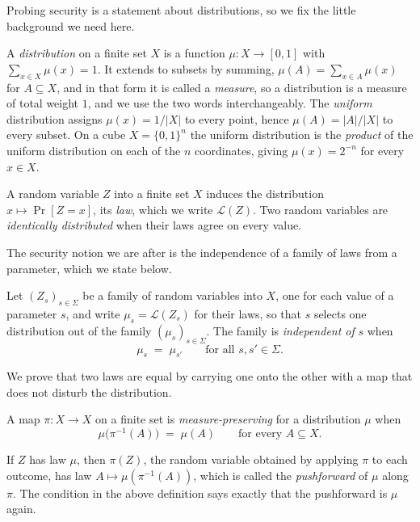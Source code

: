   Probing security is a statement about distributions, so we fix the little background 
  we need here.

  A \emph{distribution} on a finite set $X$ is
  a function $\mu : X \to [0,1]$ with $\sum_{x \in X} \mu(x) = 1$. It extends to
  subsets by summing, $\mu(A) = \sum_{x \in A} \mu(x)$ for $A \subseteq X$, and in
  that form it is called a \emph{measure}, so a distribution is a measure of total weight
  $1$, and we use the two words interchangeably. The \emph{uniform} distribution
  assigns $\mu(x) = 1/|X|$ to every point, hence $\mu(A) = |A|/|X|$ to every
  subset. On a cube $X = \{0,1\}^{n}$ the uniform distribution
  is the \emph{product} of the uniform distribution on each of the $n$ coordinates,
  giving $\mu(x) = 2^{-n}$ for every $x \in X$.

  A random variable $Z$ into a finite set $X$ induces
  the distribution $x \mapsto \Pr[Z = x]$, its \emph{law}, which we write
  $\mathcal{L}(Z)$. Two random variables are \emph{identically distributed} when
  their laws agree on every value.

  The security notion we are after is the independence of a family of laws from a
  parameter, which we state below.

  \begin{definition}
  \label{def:independence}
  Let $(Z_s)_{s \in \Sigma}$ be a family of random variables into $X$, one for each
  value of a parameter $s$, and write $\mu_s = \mathcal{L}(Z_s)$ for their laws, so
  that $s$ selects one distribution out of the family $(\mu_s)_{s \in \Sigma}$. The
  family is \emph{independent of} $s$ when
  \[
    \mu_s \;=\; \mu_{s'} \qquad \text{for all } s, s' \in \Sigma.
  \]
  \end{definition}

  We prove that two laws are equal by carrying one onto the other
  with a map that does not disturb the distribution.

  \begin{definition}
  \label{def:measure-preserving}
  A map $\pi : X \to X$ on a finite set is \emph{measure-preserving} for a
  distribution $\mu$ when
  \[
    \mu\big(\pi^{-1}(A)\big) \;=\; \mu(A) \qquad \text{for every } A \subseteq X .
  \]
  \end{definition}

  If $Z$ has law $\mu$, then $\pi(Z)$, the random variable obtained by applying
  $\pi$ to each outcome, has law $A \mapsto \mu(\pi^{-1}(A))$, which is called the
  \emph{pushforward} of $\mu$ along $\pi$. The condition in the above definition says exactly that
  the pushforward is $\mu$ again.


